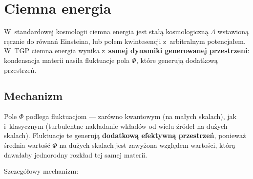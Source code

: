 \section{Ciemna energia}\label{sec:ciemna}

W~standardowej kosmologii ciemna energia jest sta\l{}\k{a} kosmologiczn\k{a}
$\Lambda$ wstawion\k{a} r\k{e}cznie do r\'owna\'n Einsteina, lub polem
kwintesencji z~arbitralnym potencja\l{}em. W~TGP ciemna energia
wynika z~\textbf{samej dynamiki generowanej przestrzeni}:
kondensacja materii nasila fluktuacje pola $\Phi$, kt\'ore
generuj\k{a} dodatkow\k{a} przestrze\'n.

\subsection{Mechanizm}\label{ssec:de-mech}

\begin{proposition}\label{prop:DE}
Pole $\Phi$ podlega fluktuacjom --- zar\'owno kwantowym
(na ma\l{}ych skalach), jak i~klasycznym (turbulentne nak\l{}adanie
wk\l{}ad\'ow od wielu \'zr\'ode\l{} na du\.zych skalach). Fluktuacje
te generuj\k{a} \textbf{dodatkow\k{a} efektywn\k{a} przestrze\'n},
poniewa\.z \'srednia warto\'s\'c $\Phi$ na du\.zych skalach jest
zawy\.zona wzgl\k{e}dem warto\'sci, kt\'or\k{a} dawa\l{}aby jednorodny
rozk\l{}ad tej samej materii.
\end{proposition}

Szczeg\'o\l{}owy mechanizm:

